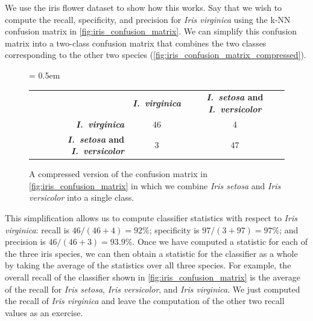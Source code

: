 We use the iris flower dataset to show how this works. Say that we wish to compute the recall, specificity, and precision for \textit{Iris virginica} using the k-NN confusion matrix in \autoref{fig:iris_confusion_matrix}. We can simplify this confusion matrix into a two-class confusion matrix that combines the two classes corresponding to the other two species (\autoref{fig:iris_confusion_matrix_compressed}).\\

 \begin{figure}[h]
\centering
\tabcolsep = 0.5em
\mySfFamily
\begin{tabular}{r c c}
\rowcolor{gray!50}
& \textbf{\textit{I.~virginica}} & \textbf{\textit{I.~setosa} and \textit{I.~versicolor}} \\
\textbf{\textit{I.~virginica}} & 46 & \phantom{5}4 \\
\textbf{\textit{I.~setosa} and \textit{I.~versicolor}} & \phantom{5}3 & 47 \\
\end{tabular}
\caption{A compressed version of the confusion matrix in \autoref{fig:iris_confusion_matrix} in which we combine \textit{Iris setosa} and \textit{Iris versicolor} into a single class.}
\label{fig:iris_confusion_matrix_compressed}
\end{figure}

This simplification allows us to compute classifier statistics with respect to \textit{Iris virginica}: recall is $46/(46+4) = 92\%$; specificity is $97/(3+97) = 97\%$; and precision is $46/(46+3) = 93.9\%$. Once we have computed a statistic for each of the three iris species, we can then obtain a statistic for the classifier as a whole by taking the average of the statistics over all three species. For example, the overall recall of the classifier shown in \autoref{fig:iris_confusion_matrix} is the average of the recall for \textit{Iris setosa}, \textit{Iris versicolor}, and \textit{Iris virginica}. We just computed the recall of \textit{Iris virginica} and leave the computation of the other two recall values as an exercise.\\

\begin{qbox}\end{qbox}

